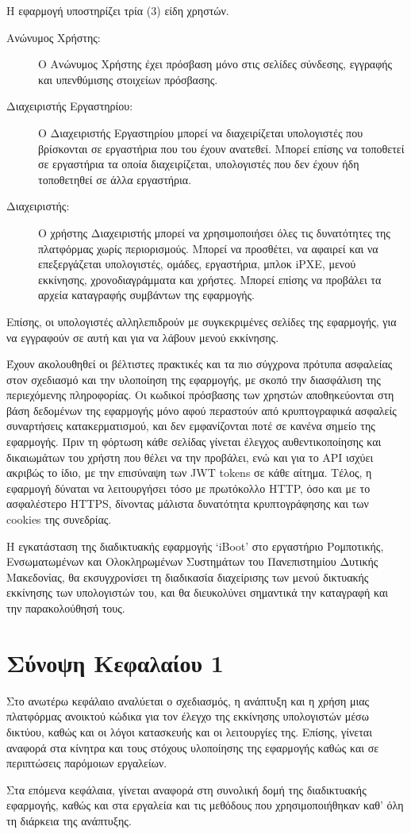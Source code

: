 Η εφαρμογή υποστηρίζει τρία (3) είδη χρηστών.
\begin{description}
	\item[Ανώνυμος Χρήστης:] Ο Ανώνυμος Χρήστης έχει πρόσβαση μόνο στις σελίδες σύνδεσης, εγγραφής και υπενθύμισης στοιχείων πρόσβασης.
	\item[Διαχειριστής Εργαστηρίου:] Ο Διαχειριστής Εργαστηρίου μπορεί να διαχειρίζεται υπολογιστές που βρίσκονται σε εργαστήρια που του έχουν ανατεθεί. Μπορεί επίσης να τοποθετεί σε εργαστήρια τα οποία διαχειρίζεται, υπολογιστές που δεν έχουν ήδη τοποθετηθεί σε άλλα εργαστήρια.
	\item[Διαχειριστής: ] Ο χρήστης Διαχειριστής μπορεί να χρησιμοποιήσει όλες τις δυνατότητες της πλατφόρμας χωρίς περιορισμούς. Μπορεί να προσθέτει, να αφαιρεί και να επεξεργάζεται υπολογιστές, ομάδες, εργαστήρια, μπλοκ iPXE, μενού εκκίνησης, χρονοδιαγράμματα και χρήστες. Μπορεί επίσης να προβάλει τα αρχεία καταγραφής συμβάντων της εφαρμογής.
\end{description}
Επίσης, οι υπολογιστές αλληλεπιδρούν με συγκεκριμένες σελίδες της εφαρμογής, για να εγγραφούν σε αυτή και για να λάβουν μενού εκκίνησης.

Έχουν ακολουθηθεί οι βέλτιστες πρακτικές και τα πιο σύγχρονα πρότυπα ασφαλείας στον σχεδιασμό και την υλοποίηση της εφαρμογής, με σκοπό την διασφάλιση της περιεχόμενης πληροφορίας. Οι κωδικοί πρόσβασης των χρηστών αποθηκεύονται στη βάση δεδομένων της εφαρμογής μόνο αφού περαστούν από κρυπτογραφικά ασφαλείς συναρτήσεις κατακερματισμού, και δεν εμφανίζονται ποτέ σε κανένα σημείο της εφαρμογής. Πριν τη φόρτωση κάθε σελίδας γίνεται έλεγχος αυθεντικοποίησης και δικαιωμάτων του χρήστη που θέλει να την προβάλει, ενώ και για το API ισχύει ακριβώς το ίδιο, με την επισύναψη των JWT tokens σε κάθε αίτημα. Τέλος, η εφαρμογή δύναται να λειτουργήσει τόσο με πρωτόκολλο HTTP, όσο και με το ασφαλέστερο HTTPS, δίνοντας μάλιστα δυνατότητα κρυπτογράφησης και των cookies της συνεδρίας.

Η εγκατάσταση της διαδικτυακής εφαρμογής `iBoot' στο εργαστήριο Ρομποτικής, Ενσωματωμένων και Ολοκληρωμένων Συστημάτων του Πανεπιστημίου Δυτικής Μακεδονίας, θα εκσυγχρονίσει τη διαδικασία διαχείρισης των μενού δικτυακής εκκίνησης των υπολογιστών του, και θα διευκολύνει σημαντικά την καταγραφή και την παρακολούθησή τους.

\section{Σύνοψη Κεφαλαίου 1}
Στο ανωτέρω κεφάλαιο αναλύεται ο σχεδιασμός, η ανάπτυξη και η χρήση μιας πλατφόρμας ανοικτού κώδικα για τον έλεγχο της εκκίνησης υπολογιστών μέσω δικτύου, καθώς και οι λόγοι κατασκευής και οι λειτουργίες της. Επίσης, γίνεται αναφορά στα κίνητρα και τους στόχους υλοποίησης της εφαρμογής καθώς και σε περιπτώσεις παρόμοιων εργαλείων.

Στα επόμενα κεφάλαια, γίνεται αναφορά στη συνολική δομή της διαδικτυακής εφαρμογής, καθώς και στα εργαλεία και τις μεθόδους που χρησιμοποιήθηκαν καθ' όλη τη διάρκεια της ανάπτυξης.
